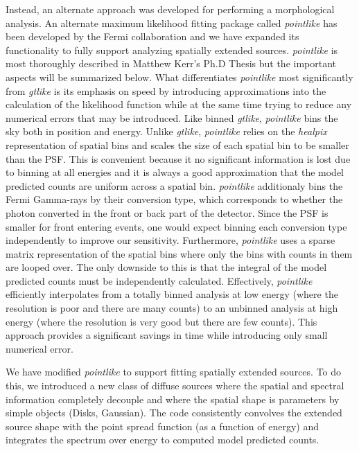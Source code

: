 \documentclass[preprint]{aastex}
\newcommand{\pointlike}{{\em pointlike}\xspace}
\newcommand{\gtlike}{{\em gtlike}\xspace}
\begin{document}
Instead, an alternate approach was developed for performing
a morphological analysis. An alternate maximum likelihood fitting
package called \pointlike has been developed by the Fermi
collaboration and we have expanded its functionality to fully support
analyzing spatially extended sources. \pointlike is most thoroughly
described in Matthew Kerr's Ph.D Thesis\cite{Matthew_kerr_phd_thesis}
but the important aspects will be summarized below. What differentiates
\pointlike most significantly from \gtlike is its emphasis
on speed by introducing approximations into the calculation of the
likelihood function while at the same time trying to reduce any
numerical errors that may be introduced.  Like binned \gtlike,
\pointlike bins the sky both in position and energy.  Unlike 
\gtlike, \pointlike relies on the {\em healpix} representation of spatial
bins\cite{healpix_paper} and scales the size of each spatial bin to be
smaller than the PSF. This is convenient because it no
significant information is lost due to binning at all energies and it is
always a good approximation that the model predicted counts are uniform
across a spatial bin. 
\pointlike additionaly bins the Fermi Gamma-rays by their conversion type,
which corresponds to whether the photon converted in the front or back
part of the detector. Since the PSF is smaller for front entering events,
one would expect binning each conversion type independently to improve
our sensitivity.
Furthermore, \pointlike uses a sparse matrix
representation of the spatial bins where only the bins with counts in them
are looped over. The only downside to this is that the integral of the
model predicted counts must be independently calculated.  Effectively,
\pointlike efficiently interpolates from a totally binned analysis
at low energy (where the resolution is poor and there are many counts)
to an unbinned analysis at high energy (where the resolution is very
good but there are few counts). This approach provides a significant
savings in time while introducing only small numerical error.

We have modified \pointlike to support fitting spatially extended
sources.  To do this, we introduced a new class of diffuse sources where
the spatial and spectral information completely decouple and where
the spatial shape is parameters by simple objects (Disks, Gaussian).
The code consistently convolves the extended source shape with the point
spread function (as a function of energy) and integrates the spectrum over energy
to computed model predicted counts.
\end{document}
